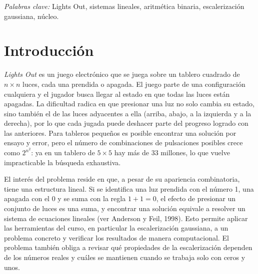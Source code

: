 \documentclass[12pt,a4paper]{article}
\theoremstyle{plain}
\theoremstyle{definition}
\theoremstyle{remark}
\begin{document}
\vspace{0.5em}
\noindent\textit{Palabras clave:} Lights Out, sistemas lineales, aritmética binaria, escalerización gaussiana, núcleo.

\newpage

\section{Introducción}

\textit{Lights Out} es un juego electrónico que se juega sobre un tablero cuadrado de $n\times n$ luces, cada una prendida o apagada. El juego parte de una configuración cualquiera y el jugador busca llegar al estado en que todas las luces están apagadas. La dificultad radica en que presionar una luz no solo cambia su estado, sino también el de las luces adyacentes a ella (arriba, abajo, a la izquierda y a la derecha), por lo que cada jugada puede deshacer parte del progreso logrado con las anteriores. Para tableros pequeños es posible encontrar una solución por ensayo y error, pero el número de combinaciones de pulsaciones posibles crece como $2^{n^2}$: ya en un tablero de $5\times 5$ hay más de 33 millones, lo que vuelve impracticable la búsqueda exhaustiva.

El interés del problema reside en que, a pesar de su apariencia combinatoria, tiene una estructura lineal. Si se identifica una luz prendida con el número 1, una apagada con el 0 y se suma con la regla $1+1=0$, el efecto de presionar un conjunto de luces es una suma, y encontrar una solución equivale a resolver un sistema de ecuaciones lineales (ver Anderson y Feil, 1998). Esto permite aplicar las herramientas del curso, en particular la escalerización gaussiana, a un problema concreto y verificar los resultados de manera computacional. El problema también obliga a revisar qué propiedades de la escalerización dependen de los números reales y cuáles se mantienen cuando se trabaja solo con ceros y unos.
\end{document}
